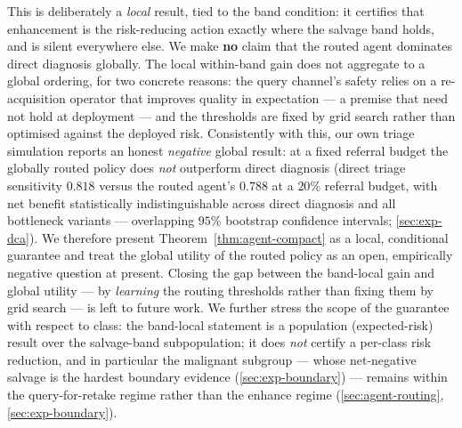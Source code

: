 This is deliberately a \emph{local} result, tied to the band condition: it certifies that
enhancement is the risk-reducing action exactly where the salvage band holds, and is silent
everywhere else. We make \textbf{no} claim that the routed agent dominates direct diagnosis
globally. The local within-band gain does not aggregate to a global ordering, for two concrete
reasons: the query channel's safety relies on a re-acquisition operator that improves quality in
expectation --- a premise that need not hold at deployment --- and the thresholds are fixed by grid
search rather than optimised against the deployed risk. Consistently with this, our own triage
simulation reports an honest \emph{negative} global result: at a fixed referral budget the globally
routed policy does \emph{not} outperform direct diagnosis (direct triage sensitivity $0.818$ versus
the routed agent's $0.788$ at a $20\%$ referral budget, with net benefit statistically
indistinguishable across direct diagnosis and all bottleneck variants --- overlapping $95\%$
bootstrap confidence intervals; \cref{sec:exp-dca}). We therefore present
Theorem~\ref{thm:agent-compact} as a local, conditional guarantee and treat the global utility of
the routed policy as an open, empirically negative question at present. Closing the gap between the
band-local gain and global utility --- by \emph{learning} the routing thresholds rather than fixing
them by grid search --- is left to future work. We further stress the scope of the guarantee with
respect to class: the band-local statement is a population (expected-risk) result over the
salvage-band subpopulation; it does \emph{not} certify a per-class risk reduction, and in
particular the malignant subgroup --- whose net-negative salvage is the hardest boundary evidence
(\cref{sec:exp-boundary}) --- remains within the query-for-retake regime rather than the enhance
regime (\cref{sec:agent-routing}, \cref{sec:exp-boundary}).

